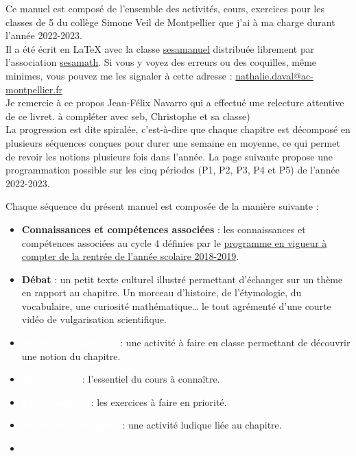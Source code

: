

Ce manuel est composé de l'ensemble des activités, cours, exercices pour les classes de 5 du collège Simone Veil de Montpellier que j'ai à ma charge durant l'année 2022-2023. \\ [1mm]
Il a été écrit en \LaTeX{} avec la classe \href{https://www.ctan.org/pkg/sesamanuel}{\blue sesamanuel} distribuée librement par l'association \href{http://www.sesamath.net}{\blue sesamath}. Si vous y voyez des erreurs ou des coquilles, même minimes, vous pouvez me les signaler à cette adresse : \href{mailto:nathalie.daval@ac-montpellier.fr}{nathalie.daval@ac-montpellier.fr} \\
Je remercie à ce propos Jean-Félix Navarro qui a effectué une relecture attentive de ce livret. {\red à compléter avec seb, Christophe et sa classe)}  \\ [10mm]

La progression est dite spiralée, c'est-à-dire que chaque \og chapitre \fg{} est décomposé en plusieurs séquences conçues pour durer une semaine en moyenne, ce qui permet de revoir les notions plusieurs fois dans l'année. La page suivante propose une programmation possible sur les cinq périodes (P1, P2, P3, P4 et P5) de l'année 2022-2023.

Chaque séquence du présent manuel est composée de la manière suivante : \\
\begin{itemize}
   \item \textcolor{B2}{\sffamily\bfseries Connaissances et compétences associées} : les connaissances et compétences associées au cycle 4 définies par le \href{https://cache.media.eduscol.education.fr/file/A-Scolarite_obligatoire/37/5/Programme2020_cycle_3_comparatif_1313375.pdf}{programme en vigueur à compter de la rentrée de l'année scolaire 2018-2019}. \\
   \item \textcolor{C1}{\sffamily\bfseries Débat} : un petit texte culturel illustré permettant d'échanger sur un thème en rapport au chapitre. Un morceau d'histoire, de l'étymologie, du vocabulaire, une curiosité mathématique\dots{} le tout agrémenté d'une courte vidéo de vulgarisation scientifique. \\
   \item \colorbox{G2}{\textcolor{white}{\sffamily\bfseries Activité d'approche}} : une activité à faire en classe permettant de découvrir une notion du chapitre. \\
   \item \colorbox{A2}{\textcolor{white}{\sffamily\bfseries Trace écrite}} : l'essentiel du cours à connaître. \\
   \item \colorbox{C2}{\textcolor{white}{\sffamily\bfseries Entraînement}} : les exercices à faire en priorité.  \\   
   \item \colorbox{PartieStatistique}{\textcolor{white}{\sffamily\bfseries Récréation, énigmes}} : une activité ludique liée au chapitre.
   \item
\end{itemize}

